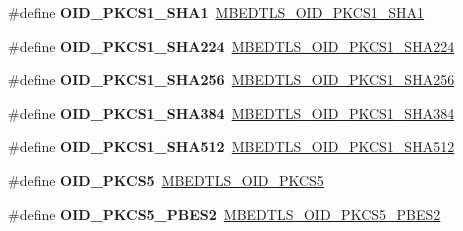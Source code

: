 \begin{DoxyCompactItemize}
\item 
\mbox{\label{compat-1_83_8h_ac2cf10aab97c7bbda9a07773db1cfbe4}} 
\#define {\bfseries O\+I\+D\+\_\+\+P\+K\+C\+S1\+\_\+\+S\+H\+A1}~\mbox{\hyperlink{oid_8h_ae710a98611c746a02a0428e62c72a4ec}{M\+B\+E\+D\+T\+L\+S\+\_\+\+O\+I\+D\+\_\+\+P\+K\+C\+S1\+\_\+\+S\+H\+A1}}
\item 
\mbox{\label{compat-1_83_8h_a5f1811bf2267224e759c2b902f8b19dd}} 
\#define {\bfseries O\+I\+D\+\_\+\+P\+K\+C\+S1\+\_\+\+S\+H\+A224}~\mbox{\hyperlink{oid_8h_af6ce7fdcb5e585cd154b3002316c8fa2}{M\+B\+E\+D\+T\+L\+S\+\_\+\+O\+I\+D\+\_\+\+P\+K\+C\+S1\+\_\+\+S\+H\+A224}}
\item 
\mbox{\label{compat-1_83_8h_a589bbb57da1f0d01fc38188f8ccb3ced}} 
\#define {\bfseries O\+I\+D\+\_\+\+P\+K\+C\+S1\+\_\+\+S\+H\+A256}~\mbox{\hyperlink{oid_8h_aa399842c889d21120906b8857746c10d}{M\+B\+E\+D\+T\+L\+S\+\_\+\+O\+I\+D\+\_\+\+P\+K\+C\+S1\+\_\+\+S\+H\+A256}}
\item 
\mbox{\label{compat-1_83_8h_ac547ba0312880283b4e7dd14147e32c9}} 
\#define {\bfseries O\+I\+D\+\_\+\+P\+K\+C\+S1\+\_\+\+S\+H\+A384}~\mbox{\hyperlink{oid_8h_a2d88f660f0ed44574780d6f1cf859afe}{M\+B\+E\+D\+T\+L\+S\+\_\+\+O\+I\+D\+\_\+\+P\+K\+C\+S1\+\_\+\+S\+H\+A384}}
\item 
\mbox{\label{compat-1_83_8h_aa7a3659e59100119ee798e84a91f2561}} 
\#define {\bfseries O\+I\+D\+\_\+\+P\+K\+C\+S1\+\_\+\+S\+H\+A512}~\mbox{\hyperlink{oid_8h_aef9372b133362b187794b599f283e4fb}{M\+B\+E\+D\+T\+L\+S\+\_\+\+O\+I\+D\+\_\+\+P\+K\+C\+S1\+\_\+\+S\+H\+A512}}
\item 
\mbox{\label{compat-1_83_8h_aabb9b3b456233b40231783a9de6ddc8b}} 
\#define {\bfseries O\+I\+D\+\_\+\+P\+K\+C\+S5}~\mbox{\hyperlink{oid_8h_abdcf10444f5d151e481644b59f8335c6}{M\+B\+E\+D\+T\+L\+S\+\_\+\+O\+I\+D\+\_\+\+P\+K\+C\+S5}}
\item 
\mbox{\label{compat-1_83_8h_a213a1762dcb162b15c2f550eb00534eb}} 
\#define {\bfseries O\+I\+D\+\_\+\+P\+K\+C\+S5\+\_\+\+P\+B\+E\+S2}~\mbox{\hyperlink{oid_8h_accd1d6812692e98ecb985a7ba63dfb4f}{M\+B\+E\+D\+T\+L\+S\+\_\+\+O\+I\+D\+\_\+\+P\+K\+C\+S5\+\_\+\+P\+B\+E\+S2}}
\item 

\end{DoxyCompactItemize}
